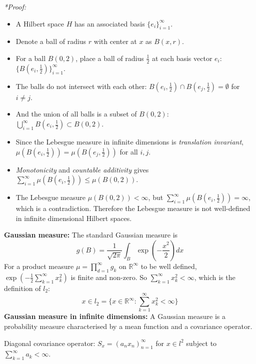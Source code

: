 \documentclass[12pt]{article}
\begin{document}
\textit{*Proof:}
\begin{itemize}
\item A Hilbert space $H$ has an associated basis $\{e_i\}_{i=1}^\infty$. 
\item Denote a ball of radius $r$ with center at $x$ as $B(x,r)$. 
\item For a ball $B(0,2)$, place a ball of radius $\frac{1}{2}$ at each basis vector $e_i$: $\{B(e_i, \frac{1}{2})\}_{i=1}^\infty$.
\item The balls do not intersect with each other: $B(e_i, \frac{1}{2}) \cap B(e_j, \frac{1}{2}) = \emptyset$ for $i \neq j$.
\item And the union of all balls is a subset of $B(0, 2)$: $\bigcup_{i=1}^\infty B(e_i, \frac{1}{2}) \subset B(0, 2)$.
\item Since the Lebesgue measure in infinite dimensions is \textit{translation invariant}, $\mu(B(e_i, \frac{1}{2})) = \mu(B(e_j, \frac{1}{2}))$ for all $i, j$.
\item \textit{Monotonicity} and \textit{countable additivity} gives $\sum_{i=1}^\infty \mu(B(e_i, \frac{1}{2})) \leq \mu(B(0, 2))$.
\item The Lebesgue measure $\mu(B(0,2)) < \infty$, but $\sum_{i=1}^{\infty} \mu(B(e_i, \frac{1}{2})) = \infty$, which is a contradiction. Therefore the Lebesgue measure is not well-defined in infinite dimensional Hilbert spaces.
\end{itemize}

\textbf{Gaussian measure:} The standard Gaussian measure is
$$
g(B) = \frac{1}{\sqrt{2\pi}} \int_B \exp\left(-\frac{x^2}{2}\right) dx
$$
For a product measure $\mu = \prod_{d=1}^\infty g_k$ on $\mathbb{R}^\infty$ to be well defined, $\exp\left(-\frac{1}{2}\sum_{k=1}^\infty x_k^2\right)$ is finite and non-zero. So $\sum_{k=1}^\infty x_k^2 < \infty$, which is the definition of $l_2$:
$$
x \in l_2 = \{x \in \mathbb{R}^\infty : \sum_{k=1}^\infty x_k^2 < \infty\}
$$
\textbf{Gaussian measure in infinite dimensions:} A Gaussian measure is a probability measure characterised by a mean function and a covariance operator.

Diagonal covariance operator: $S_x = (a_n x_n)^{\infty}_{n=1}$ for $x \in l^2$ subject to $\sum_{k=1}^\infty a_k < \infty$.
\end{document}

